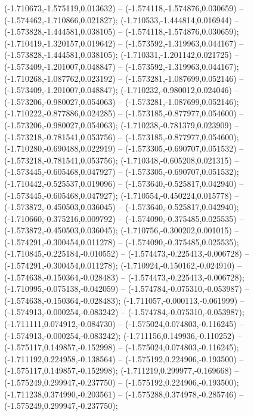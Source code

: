 (-1.710673,-1.575119,0.013632) -- (-1.574118,-1.574876,0.030659) -- (-1.574462,-1.710866,0.021827);
 (-1.710533,-1.444814,0.016944) -- (-1.573828,-1.444581,0.038105) -- (-1.574118,-1.574876,0.030659);
 (-1.710419,-1.320157,0.019642) -- (-1.573592,-1.319963,0.044167) -- (-1.573828,-1.444581,0.038105);
 (-1.710331,-1.201142,0.021725) -- (-1.573409,-1.201007,0.048847) -- (-1.573592,-1.319963,0.044167);
 (-1.710268,-1.087762,0.023192) -- (-1.573281,-1.087699,0.052146) -- (-1.573409,-1.201007,0.048847);
 (-1.710232,-0.980012,0.024046) -- (-1.573206,-0.980027,0.054063) -- (-1.573281,-1.087699,0.052146);
 (-1.710222,-0.877886,0.024285) -- (-1.573185,-0.877977,0.054600) -- (-1.573206,-0.980027,0.054063);
 (-1.710238,-0.781379,0.023909) -- (-1.573218,-0.781541,0.053756) -- (-1.573185,-0.877977,0.054600);
 (-1.710280,-0.690488,0.022919) -- (-1.573305,-0.690707,0.051532) -- (-1.573218,-0.781541,0.053756);
 (-1.710348,-0.605208,0.021315) -- (-1.573445,-0.605468,0.047927) -- (-1.573305,-0.690707,0.051532);
 (-1.710442,-0.525537,0.019096) -- (-1.573640,-0.525817,0.042940) -- (-1.573445,-0.605468,0.047927);
 (-1.710554,-0.450224,0.015778) -- (-1.573872,-0.450503,0.036045) -- (-1.573640,-0.525817,0.042940);
 (-1.710660,-0.375216,0.009792) -- (-1.574090,-0.375485,0.025535) -- (-1.573872,-0.450503,0.036045);
 (-1.710756,-0.300202,0.001015) -- (-1.574291,-0.300454,0.011278) -- (-1.574090,-0.375485,0.025535);
 (-1.710845,-0.225184,-0.010552) -- (-1.574473,-0.225413,-0.006728) -- (-1.574291,-0.300454,0.011278);
 (-1.710924,-0.150162,-0.024910) -- (-1.574638,-0.150364,-0.028483) -- (-1.574473,-0.225413,-0.006728);
 (-1.710995,-0.075138,-0.042059) -- (-1.574784,-0.075310,-0.053987) -- (-1.574638,-0.150364,-0.028483);
 (-1.711057,-0.000113,-0.061999) -- (-1.574913,-0.000254,-0.083242) -- (-1.574784,-0.075310,-0.053987);
 (-1.711111,0.074912,-0.084730) -- (-1.575024,0.074803,-0.116245) -- (-1.574913,-0.000254,-0.083242);
 (-1.711156,0.149936,-0.110252) -- (-1.575117,0.149857,-0.152998) -- (-1.575024,0.074803,-0.116245);
 (-1.711192,0.224958,-0.138564) -- (-1.575192,0.224906,-0.193500) -- (-1.575117,0.149857,-0.152998);
 (-1.711219,0.299977,-0.169668) -- (-1.575249,0.299947,-0.237750) -- (-1.575192,0.224906,-0.193500);
 (-1.711238,0.374990,-0.203561) -- (-1.575288,0.374978,-0.285746) -- (-1.575249,0.299947,-0.237750);

